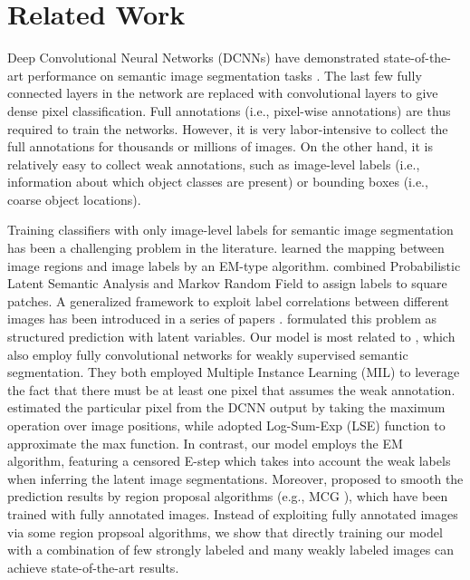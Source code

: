 \section{Related Work}
Deep Convolutional Neural Networks (DCNNs) have demonstrated state-of-the-art performance on semantic image segmentation tasks \citep{chen2014semantic, eigen2014predicting, long2014fully}. The last few fully connected layers in the network are replaced with convolutional layers \citep{papandreou2014untangling} to give dense pixel classification. Full annotations (i.e., pixel-wise annotations) are thus required to train the networks. However, it is very labor-intensive to collect the full annotations for thousands or millions of images. On the other hand, it is relatively easy to collect weak annotations, such as image-level labels (i.e., information about which object classes are present) or bounding boxes (i.e., coarse object locations).

Training classifiers with only image-level labels for semantic image segmentation has been a challenging problem in the literature. \citet{duygulu2002object} learned the mapping between image regions and image labels by an EM-type algorithm. \citet{verbeek2007region} combined Probabilistic Latent Semantic Analysis and Markov Random Field to assign labels to square patches. A generalized framework to exploit label correlations between different images has been introduced in a series of papers \citep{vezhnevets2010towards, vezhnevets2011weakly, vezhnevets2012weakly}. \citet{xu2014tell} formulated this problem as structured prediction with latent variables. Our model is most related to \citet{pathak2014fully, pinheiro2014weakly}, which also employ fully convolutional networks for weakly supervised semantic segmentation. They both employed Multiple Instance Learning (MIL) to leverage the fact that there must be at least one pixel that assumes the weak annotation. \citet{pathak2014fully} estimated the particular pixel from the DCNN output by taking the maximum operation over image positions, while \citet{pinheiro2014weakly} adopted Log-Sum-Exp (LSE) function to approximate the max function. In contrast, our model employs the EM algorithm, featuring a censored E-step which takes into account the weak labels when inferring the latent image segmentations. Moreover, \citet{pinheiro2014weakly} proposed to smooth the prediction results by region proposal algorithms (e.g., MCG \citep{arbelaez2014multiscale}), which have been trained with fully annotated images. Instead of exploiting fully annotated images via some region propsoal algorithms, we show that directly training our model with a combination of few strongly labeled and many weakly labeled images can achieve state-of-the-art results.

